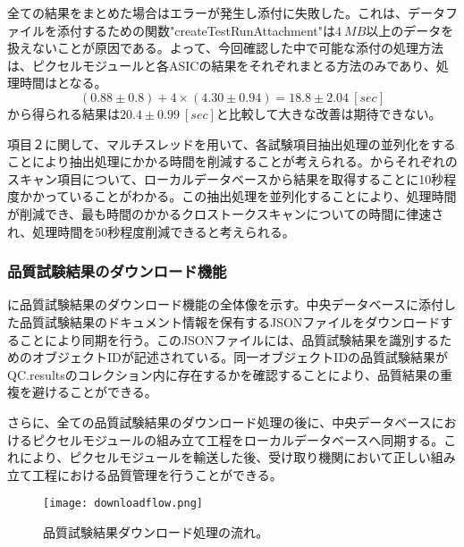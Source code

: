 全ての結果をまとめた場合はエラーが発生し添付に失敗した。これは、データファイルを添付するための関数"createTestRunAttachment"は$4\ \si{MB}$以上のデータを扱えないことが原因である。よって、今回確認した中で可能な添付の処理方法は、ピクセルモジュールと各ASICの結果をそれぞれまとる方法のみであり、処理時間はとなる。
\begin{equation}
  \label{eq:asshuku}
  (0.88 \pm 0.8) + 4\times(4.30 \pm 0.94) = 18.8 \pm 2.04\ [\si{sec}]
\end{equation}
から得られる結果は$20.4 \pm 0.99\ [\si{sec}]$と比較して大きな改善は期待できない。

項目２に関して、マルチスレッドを用いて、各試験項目抽出処理の並列化をすることにより抽出処理にかかる時間を削減することが考えられる。からそれぞれのスキャン項目について、ローカルデータベースから結果を取得することに10秒程度かかっていることがわかる。この抽出処理を並列化することにより、処理時間が削減でき、最も時間のかかるクロストークスキャンについての時間に律速され、処理時間を$50$秒程度削減できると考えられる。


\subsubsection{品質試験結果のダウンロード機能}


に品質試験結果のダウンロード機能の全体像を示す。中央データベースに添付した品質試験結果のドキュメント情報を保有するJSONファイルをダウンロードすることにより同期を行う。このJSONファイルには、品質試験結果を識別するためのオブジェクトIDが記述されている。同一オブジェクトIDの品質試験結果がQC.resultsのコレクション内に存在するかを確認することにより、品質結果の重複を避けることができる。

さらに、全ての品質試験結果のダウンロード処理の後に、中央データベースにおけるピクセルモジュールの組み立て工程をローカルデータベースへ同期する。これにより、ピクセルモジュールを輸送した後、受け取り機関において正しい組み立て工程における品質管理を行うことができる。

\begin{figure}[tbp]
  \centering
  \texttt{[image: downloadflow.png]}
  \caption[品質試験結果ダウンロード処理の流れ]{品質試験結果ダウンロード処理の流れ。}
  \label{fig:downloadresults}
\end{figure}



